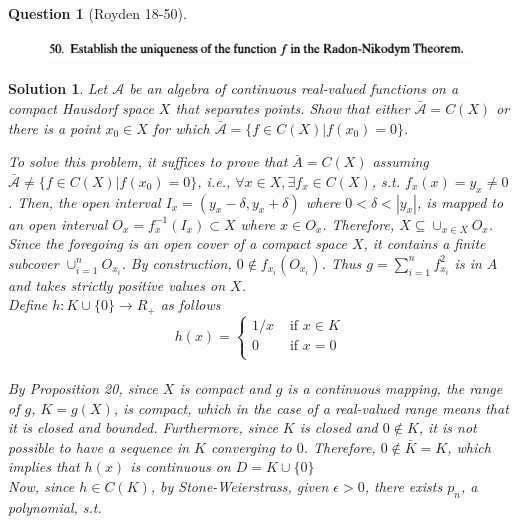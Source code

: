 \documentclass{article} %
\theoremstyle{quest}
\newtheorem*{question}{Question}
\newtheorem*{solution}{Solution}
\begin{document}
\begin{question}[Royden 18-50]
\hfill
\begin{figure}[h!]
  \centering
    \includegraphics[width=1\textwidth]{rv-18-50.png}
\end{figure}
\end{question}
\begin{solution}
Let $\mathcal{A}$ be an algebra of continuous real-valued functions on a compact Hausdorf space $X$ that separates points. Show that either $\bar {\mathcal{A}}=C(X)$ or there is a point $x_0 \in X$ for which $\bar{\mathcal{A}}=\{f \in C(X)|f(x_0)=0\}$. 

To solve this problem, it suffices to prove that $\bar{A}=C(X)$ assuming $\bar{\mathcal{A}}\neq \{f \in C(X)|f(x_0)=0\}$, i.e.,  $\forall x \in X, \exists f_x\in C(X)$, s.t.  $f_x(x) =y_x\neq 0$. Then, the open interval $I_x=(y_x-\delta, y_x+ \delta)$ where $0<\delta<|y_x|$, is mapped to an open interval $O_x=f_x^{-1}(I_x) \subset X$ where $x \in O_x$.   Therefore, $X\subseteq \cup_{x \in X}O_x$. Since the foregoing is an open cover of a compact space $X$,  it contains a finite subcover      $\cup_{i=1}^nO_{x_i}$.  By construction, $0 \notin f_{x_i}(O_{x_i})$. Thus $g=\sum_{i=1}^n f^2_{x_i}$ is in $A$ and takes strictly positive values on $X$.  \\ 

Define $h:K\cup\{0\}\rightarrow R_+$ as follows\\
$$h(x)=\begin{cases}
1/x & \text{ if } x \in K\\
0 & \text{ if } x =0\\
\end{cases}$$\\  

By Proposition 20, since $X$ is compact and $g$ is a continuous mapping, the range of $g$, $K=g(X)$, is compact, which in the case of a real-valued range means that it is closed and bounded. Furthermore, since $K$ is closed and $0\notin K$, it is not possible to have a  sequence in $K$ converging to $0$. Therefore, $0 \notin \bar{K}=K$, which implies that  $h(x)$ is continuous on $D=K\cup\{0\}$\\

Now, since $h\in C(K)$, by Stone-Weierstrass, given  $\epsilon >0$, there exists $p_{n}$, a polynomial, s.t.\\


\end{solution}
\end{document}
